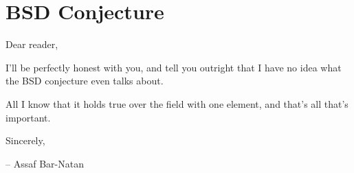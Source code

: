 \setlength\parindent{12pt}

\setcounter{section}{0}

\section{BSD Conjecture}
\vspace{-0.2cm}
Dear reader,

I'll be perfectly honest with you, and tell you outright that I have
no idea what the BSD conjecture even talks about.

All I know that it holds true over the field with one element, and
that's all that's important.

Sincerely,
\vspace{-0.1cm}
\begin{flushright}
  -- Assaf Bar-Natan
\end{flushright}
\setlength\parindent{0pt}
